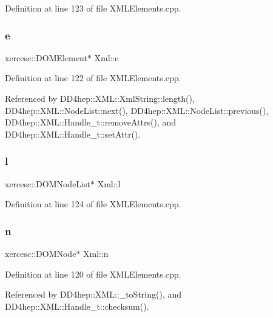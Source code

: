 Definition at line 123 of file X\+M\+L\+Elements.\+cpp.

\hypertarget{union_xml_a6d7cc65c82929e86d2f8e2b300a10624}{}\label{union_xml_a6d7cc65c82929e86d2f8e2b300a10624} 
\subsubsection{\texorpdfstring{e}{e}}
{\footnotesize\ttfamily xercesc\+::\+D\+O\+M\+Element$\ast$ Xml\+::e}



Definition at line 122 of file X\+M\+L\+Elements.\+cpp.



Referenced by D\+D4hep\+::\+X\+M\+L\+::\+Xml\+String\+::length(), D\+D4hep\+::\+X\+M\+L\+::\+Node\+List\+::next(), D\+D4hep\+::\+X\+M\+L\+::\+Node\+List\+::previous(), D\+D4hep\+::\+X\+M\+L\+::\+Handle\+\_\+t\+::remove\+Attrs(), and D\+D4hep\+::\+X\+M\+L\+::\+Handle\+\_\+t\+::set\+Attr().

\hypertarget{union_xml_ac527c7a9b99fd1748b7a33e401b7f003}{}\label{union_xml_ac527c7a9b99fd1748b7a33e401b7f003} 
\subsubsection{\texorpdfstring{l}{l}}
{\footnotesize\ttfamily xercesc\+::\+D\+O\+M\+Node\+List$\ast$ Xml\+::l}



Definition at line 124 of file X\+M\+L\+Elements.\+cpp.

\hypertarget{union_xml_a6b78aa150fc8fa96aa1ce57c01a5268d}{}\label{union_xml_a6b78aa150fc8fa96aa1ce57c01a5268d} 
\subsubsection{\texorpdfstring{n}{n}}
{\footnotesize\ttfamily xercesc\+::\+D\+O\+M\+Node$\ast$ Xml\+::n}



Definition at line 120 of file X\+M\+L\+Elements.\+cpp.



Referenced by D\+D4hep\+::\+X\+M\+L\+::\+\_\+to\+String(), and D\+D4hep\+::\+X\+M\+L\+::\+Handle\+\_\+t\+::checksum().

\hypertarget{union_xml_a1049a06460eb8ee2878b7ced0fdb19e8}{}\label{union_xml_a1049a06460eb8ee2878b7ced0fdb19e8} 
